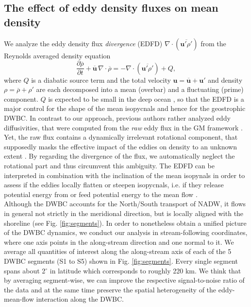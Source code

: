 \documentclass{ametsoc}
\begin{document}
\subsection{The effect of eddy density fluxes on mean density}
\label{sec:eddy_effect}
We analyze the eddy density flux \textit{divergence} (EDFD) $\nabla \cdot (\overline{\mathbf u' \rho'}) $ from the Reynolds averaged density equation
\begin{equation}
\frac{\partial \overline{\rho}}{\partial t} + \mathbf{\overline {u}}\,\nabla \cdot \overline{\rho} = -\nabla \cdot (\overline{\mathbf u' \rho'}) +Q,
\label{eq:density}
\end{equation}
where $Q$ is a diabatic source term and the total velocity $\mathbf{u} = \overline{\mathbf{u}} +\mathbf u'$ and density $\rho = \overline{\rho} + \rho'$ are each decomposed into a mean (overbar) and a fluctuating (prime) component. $Q$ is expected to be small in the deep ocean \citep{Ferrari2016}, so that the EDFD is a major control for the shape of the mean isopycnals and hence for the geostrophic DWBC. In contrast to our approach, previous authors rather analyzed eddy diffusivities, that were computed from the \textit{raw} eddy flux in the GM framework \citep{Jayne2002, Eden2007}. Yet, the raw flux contains a dynamically irrelevant rotational component, that supposedly masks the effective impact of the eddies on density to an unknown extent \citep{Marshall1981, Fox-Kemper2003, Eden2007}. By regarding the divergence of the flux, we automatically neglect the rotational part and thus circumvent this ambiguity. The EDFD can be interpreted in combination with the inclination of the mean isopynals in order to assess if the eddies locally flatten or steepen isopycnals, i.e. if they release potential energy from or feed potential energy to the mean flow \citep{Treguier1999}. \\
Although the DWBC accounts for the North/South transport of NADW, it flows in general not strictly in the meridional direction, but is locally aligned with the shoreline (see Fig. \ref{fig:segments}). In order to nonetheless obtain a unified picture of the DWBC dynamics, we conduct our analysis in stream-following coordinates, where one axis points in the along-stream direction and one normal to it. We average all quantities of interest along the along-stream axis of each of the 5 DWBC segments (S1 to S5) shown in Fig. \ref{fig:segments}. Every single segment spans about 2$^\circ$ in latitude which corresponds to roughly 220 km. We think that by averaging segment-wise, we can improve the respective signal-to-noise ratio of the data and at the same time preserve the spatial heterogeneity of the eddy-mean-flow interaction along the DWBC.\\
\end{document}

